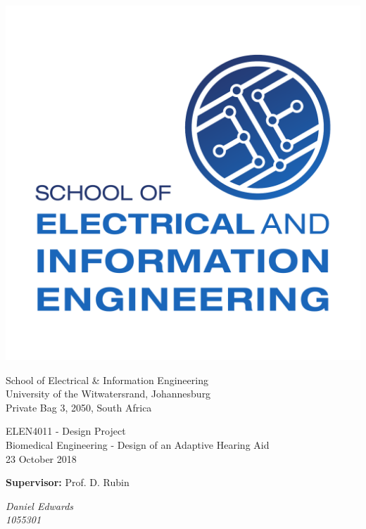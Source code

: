 \documentclass[11pt,onecolumn]{witseiepaper}
\begin{document}
\begin{titlepage}
\begin{center}
 

 
\begin{minipage}{0.30\linewidth}
\centering
\includegraphics[height=8\baselineskip]{EIE_better.pdf}
\end{minipage}
\begin{minipage}{0.6\linewidth}
\centering
{\Large School of Electrical \& Information Engineering} \\
{\large University of the Witwatersrand, Johannesburg \\
Private Bag 3, 2050, South Africa}
\end{minipage}

\vspace{0.5cm}
\centering
\begin{tcolorbox}[width=\linewidth, colframe=blue(ryb), colback=blue(ryb), sharp corners=east,sharp corners= west]
\centering
{\color{white} {\large ELEN4011 - Design Project}\\
Biomedical Engineering - Design of an Adaptive Hearing Aid\\
23 October 2018}
\end{tcolorbox}

\vspace{3cm}

{\bf Supervisor:} Prof. D. Rubin 

\vspace{3cm}

\textit{Daniel Edwards\\
1055301}


\end{center}
\end{titlepage}
\end{document}
